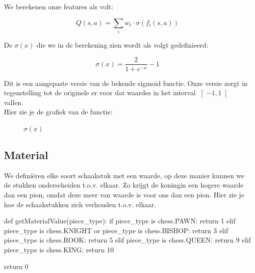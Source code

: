 \documentclass[a4paper,openany]{uantwerpenassignment}
\begin{document}
We berekenen onze features als volt:

$$
Q(s,a) = \sum_{i} w_{i} \cdot \sigma \left( f_i(s, a)\right)
$$

De $\sigma(x)$ die we in de berekening zien wordt als volgt gedefinieerd:

$$
\sigma(x) = \frac{2}{1 + e^{-x}} - 1
$$

Dit is een aangepaste versie van de bekende sigmoid\cite{WSF} functie. Onze versie zorgt in tegenstelling tot de originele er voor dat waardes in het interval $\left]-1,1\right[$ vallen.\\
Hier zie je de grafiek van de functie:

\begin{figure}[h]
    \centering
    \caption{$\sigma(x)$} \label{fig:sigmoid}
\end{figure}



\subsection{Material}
We definiëren elke soort schaakstuk met een waarde, op deze manier kunnen we de stukken onderscheiden t.o.v. elkaar. Zo krijgt de koningin een hogere waarde dan een pion, omdat deze meer van waarde is voor ons dan een pion. Hier zie je hoe de schaakstukken zich verhouden t.o.v. elkaar.

\begin{python}
def getMaterialValue(piece_type):
    if piece_type is chess.PAWN:
        return 1
    elif piece_type is chess.KNIGHT or piece_type is chess.BISHOP:
        return 3
    elif piece_type is chess.ROOK:
        return 5
    elif piece_type is chess.QUEEN:
        return 9
    elif piece_type is chess.KING:
        return 10

    return 0
\end{python}
\end{document}
